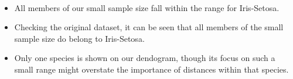 \documentclass[11pt]{article}
\providecommand{\tightlist}{%
      \setlength{\itemsep}{0pt}\setlength{\parskip}{0pt}}
\begin{document}
    \begin{center}
    \end{center}
    { \hspace*{\fill} \\}
    
    \begin{itemize}
\tightlist
\item
  All members of our small sample size fall within the range for
  Iris-Setosa.
\item
  Checking the original dataset, it can be seen that all members of the
  small sample size do belong to Iris-Setosa.
\item
  Only one species is shown on our dendogram, though its focus on such a
  small range might overstate the importance of distances within that
  species.
\end{itemize}


    
    
    
\end{document}
